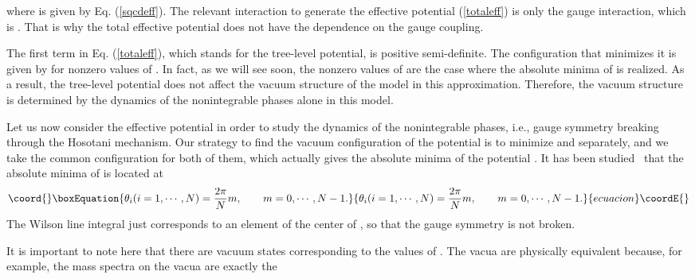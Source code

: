 \documentclass[a4paper,12pt]{article}
\begin{document}
where \coordHE{} is given by Eq. (\ref{sqcdeff}). 
The relevant interaction to generate the 
effective potential (\ref{totaleff}) is only the
gauge interaction, which is \coordHE{}. That is why the total effective
potential does not have the dependence on the gauge coupling.
\par
The first term in Eq. (\ref{totaleff}), which stands for the 
tree-level potential, is positive semi-definite.
The configuration that minimizes it
is given by \coordHE{} for nonzero values 
of \coordHE{}. In fact, as we will see soon, the 
nonzero values of \coordHE{} are the case where  
the absolute minima of \coordHE{} is realized.
As a result, the tree-level potential 
does not affect the vacuum structure
of the model in this approximation. Therefore, the vacuum structure is 
determined by the dynamics of the nonintegrable phases alone in this model.
\par
Let us now consider the effective potential \coordHE{} in 
order to study the dynamics of the nonintegrable phases, i.e., gauge
symmetry breaking through the Hosotani mechanism. 
Our strategy to find the vacuum configuration of
the potential is to minimize \coordHE{} 
and \coordHE{} separately, and we take 
the common configuration for both of them, which actually gives the 
absolute minima of the potential \coordHE{}. It has been
studied~\cite{takenagab} that the absolute minima
of \coordHE{} is located at
\begin{equation}\coord{}\boxEquation{
\theta_i(i=1,\cdots, N)={{2\pi}\over{N}}m, \qquad m=0, \cdots, N-1.
\label{symsol}
}{
\theta_i(i=1,\cdots, N)={{2\pi}\over{N}}m, \qquad m=0, \cdots, N-1.
}{ecuacion}\coordE{}\end{equation}
The Wilson line integral just corresponds to an element of the 
center of \coordHE{}, so that the gauge symmetry is not broken.
\par
It is important to note here that there are \coordHE{} vacuum states
corresponding to the values of \coordHE{}.
The \coordHE{} vacua are physically equivalent
because, for example, the mass spectra on the vacua are exactly the 
\end{document}
